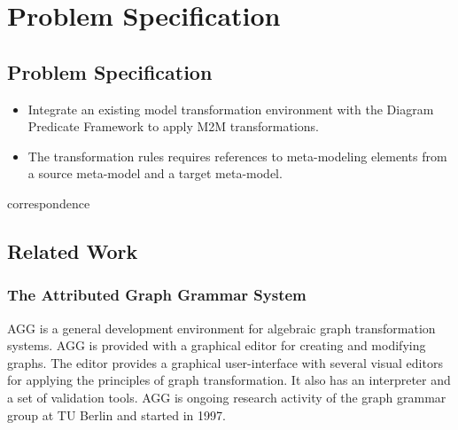 
\chapter{Problem Specification} %

\label{Chapter4} %



\section{Problem Specification}

\begin{itemize}
  
  
  \item Integrate an existing model transformation environment with the Diagram
  Predicate Framework to apply M2M transformations.
  
  \item The transformation rules requires references to meta-modeling
  elements from a source meta-model and a target meta-model.

\end{itemize}
correspondence 
\section{Related Work}

\subsection{The Attributed Graph Grammar System}

AGG is a general development environment for algebraic graph
transformation systems. AGG is provided with a graphical editor for creating
and modifying graphs. The editor provides a graphical user-interface with
several visual editors for applying the principles of graph transformation. It
also has an interpreter and a set of validation tools. AGG is ongoing research
activity of the graph grammar group at TU Berlin and started in 1997.

